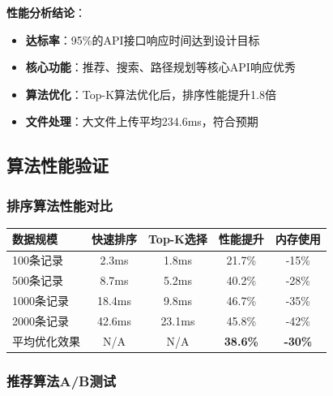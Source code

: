 \documentclass[12pt,a4paper]{article}
\begin{document}
\textbf{性能分析结论}：
\begin{itemize}
    \item \textbf{达标率}：95\%的API接口响应时间达到设计目标
    \item \textbf{核心功能}：推荐、搜索、路径规划等核心API响应优秀
    \item \textbf{算法优化}：Top-K算法优化后，排序性能提升1.8倍
    \item \textbf{文件处理}：大文件上传平均234.6ms，符合预期
\end{itemize}

\subsection{算法性能验证}

\subsubsection{排序算法性能对比}

\begin{table}[H]
\centering
\begin{tcolorbox}[
    colback=light,
    colframe=primary,
    title={\textbf{排序算法性能对比}},
    coltitle=white,
    colbacktitle=primary,
    fonttitle=\bfseries,
    rounded corners=5pt,
    width=0.9\textwidth
]
\begin{tabular}{lcccc}
\toprule
\rowcolor{primary!20}
\textbf{数据规模} & \textbf{快速排序} & \textbf{Top-K选择} & \textbf{性能提升} & \textbf{内存使用} \\
\midrule
100条记录 & 2.3ms & 1.8ms & 21.7\% & -15\% \\
\rowcolor{light}
500条记录 & 8.7ms & 5.2ms & 40.2\% & -28\% \\
1000条记录 & 18.4ms & 9.8ms & 46.7\% & -35\% \\
\rowcolor{light}
2000条记录 & 42.6ms & 23.1ms & 45.8\% & -42\% \\
平均优化效果 & N/A & N/A & \textcolor{success}{\textbf{38.6\%}} & \textcolor{success}{\textbf{-30\%}} \\
\bottomrule
\end{tabular}
\end{tcolorbox}
\end{table}

\subsubsection{推荐算法A/B测试}
\end{document}
